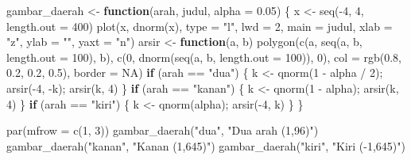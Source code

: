 \documentclass[
  indonesian,
  letterpaper,
]{book}
\newenvironment{Shaded}{\begin{snugshade}}{\end{snugshade}}
\newcommand{\AttributeTok}[1]{\textcolor[rgb]{0.40,0.45,0.13}{#1}}
\newcommand{\ConstantTok}[1]{\textcolor[rgb]{0.56,0.35,0.01}{#1}}
\newcommand{\ControlFlowTok}[1]{\textcolor[rgb]{0.00,0.23,0.31}{\textbf{#1}}}
\newcommand{\DecValTok}[1]{\textcolor[rgb]{0.68,0.00,0.00}{#1}}
\newcommand{\FloatTok}[1]{\textcolor[rgb]{0.68,0.00,0.00}{#1}}
\newcommand{\FunctionTok}[1]{\textcolor[rgb]{0.28,0.35,0.67}{#1}}
\newcommand{\NormalTok}[1]{\textcolor[rgb]{0.00,0.23,0.31}{#1}}
\newcommand{\OtherTok}[1]{\textcolor[rgb]{0.00,0.23,0.31}{#1}}
\newcommand{\SpecialCharTok}[1]{\textcolor[rgb]{0.37,0.37,0.37}{#1}}
\newcommand{\StringTok}[1]{\textcolor[rgb]{0.13,0.47,0.30}{#1}}
\begin{document}
\begin{Shaded}
\begin{Highlighting}[]
\NormalTok{gambar\_daerah }\OtherTok{\textless{}{-}} \ControlFlowTok{function}\NormalTok{(arah, judul, }\AttributeTok{alpha =} \FloatTok{0.05}\NormalTok{) \{}
\NormalTok{  x           }\OtherTok{\textless{}{-}} \FunctionTok{seq}\NormalTok{(}\SpecialCharTok{{-}}\DecValTok{4}\NormalTok{, }\DecValTok{4}\NormalTok{, }\AttributeTok{length.out =} \DecValTok{400}\NormalTok{)}
  \FunctionTok{plot}\NormalTok{(x, }\FunctionTok{dnorm}\NormalTok{(x), }\AttributeTok{type =} \StringTok{"l"}\NormalTok{, }\AttributeTok{lwd =} \DecValTok{2}\NormalTok{, }\AttributeTok{main =}\NormalTok{ judul, }\AttributeTok{xlab =} \StringTok{"z"}\NormalTok{, }\AttributeTok{ylab =} \StringTok{""}\NormalTok{,}
       \AttributeTok{yaxt =} \StringTok{"n"}\NormalTok{)}
\NormalTok{  arsir }\OtherTok{\textless{}{-}} \ControlFlowTok{function}\NormalTok{(a, b) }\FunctionTok{polygon}\NormalTok{(}\FunctionTok{c}\NormalTok{(a, }\FunctionTok{seq}\NormalTok{(a, b, }\AttributeTok{length.out =} \DecValTok{100}\NormalTok{), b),}
                                  \FunctionTok{c}\NormalTok{(}\DecValTok{0}\NormalTok{, }\FunctionTok{dnorm}\NormalTok{(}\FunctionTok{seq}\NormalTok{(a, b, }\AttributeTok{length.out =} \DecValTok{100}\NormalTok{)), }\DecValTok{0}\NormalTok{),}
                                  \AttributeTok{col =} \FunctionTok{rgb}\NormalTok{(}\FloatTok{0.8}\NormalTok{, }\FloatTok{0.2}\NormalTok{, }\FloatTok{0.2}\NormalTok{, }\FloatTok{0.5}\NormalTok{), }\AttributeTok{border =} \ConstantTok{NA}\NormalTok{)}
  \ControlFlowTok{if}\NormalTok{ (arah }\SpecialCharTok{==} \StringTok{"dua"}\NormalTok{)   \{ k }\OtherTok{\textless{}{-}} \FunctionTok{qnorm}\NormalTok{(}\DecValTok{1} \SpecialCharTok{{-}}\NormalTok{ alpha }\SpecialCharTok{/} \DecValTok{2}\NormalTok{); }\FunctionTok{arsir}\NormalTok{(}\SpecialCharTok{{-}}\DecValTok{4}\NormalTok{, }\SpecialCharTok{{-}}\NormalTok{k); }\FunctionTok{arsir}\NormalTok{(k, }\DecValTok{4}\NormalTok{) \}}
  \ControlFlowTok{if}\NormalTok{ (arah }\SpecialCharTok{==} \StringTok{"kanan"}\NormalTok{) \{ k }\OtherTok{\textless{}{-}} \FunctionTok{qnorm}\NormalTok{(}\DecValTok{1} \SpecialCharTok{{-}}\NormalTok{ alpha); }\FunctionTok{arsir}\NormalTok{(k, }\DecValTok{4}\NormalTok{) \}}
  \ControlFlowTok{if}\NormalTok{ (arah }\SpecialCharTok{==} \StringTok{"kiri"}\NormalTok{)  \{ k }\OtherTok{\textless{}{-}} \FunctionTok{qnorm}\NormalTok{(alpha); }\FunctionTok{arsir}\NormalTok{(}\SpecialCharTok{{-}}\DecValTok{4}\NormalTok{, k) \}}
\NormalTok{\}}

\FunctionTok{par}\NormalTok{(}\AttributeTok{mfrow =} \FunctionTok{c}\NormalTok{(}\DecValTok{1}\NormalTok{, }\DecValTok{3}\NormalTok{))}
\FunctionTok{gambar\_daerah}\NormalTok{(}\StringTok{"dua"}\NormalTok{,   }\StringTok{"Dua arah (1,96)"}\NormalTok{)}
\FunctionTok{gambar\_daerah}\NormalTok{(}\StringTok{"kanan"}\NormalTok{, }\StringTok{"Kanan (1,645)"}\NormalTok{)}
\FunctionTok{gambar\_daerah}\NormalTok{(}\StringTok{"kiri"}\NormalTok{,  }\StringTok{"Kiri ({-}1,645)"}\NormalTok{)}
\end{Highlighting}
\end{Shaded}
\end{document}
